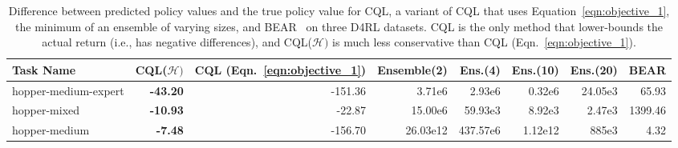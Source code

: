 \begin{table}[h]
\captionsetup{font=small}
\centering
\vspace{-5pt}
    \fontsize{8}{8}\selectfont
    \begin{tabular}{l|r|r||r|r|r|r|r}
    \hline
        \textbf{Task Name} & \textbf{CQL($\mathcal{H})$} & \textbf{CQL (Eqn.~\ref{eqn:objective_1})} & \textbf{Ensemble(2)}  & \textbf{Ens.(4)} & \textbf{Ens.(10)} & \textbf{Ens.(20)} & \textbf{BEAR} \\
        \hline
        hopper-medium-expert & \textbf{-43.20} & -151.36 & 3.71e6 & 2.93e6 & 0.32e6 & 24.05e3 & 65.93 \\
        hopper-mixed & \textbf{-10.93} & -22.87 & 15.00e6 &  59.93e3 & 8.92e3 & 2.47e3 & 1399.46 \\
        hopper-medium & \textbf{-7.48} & -156.70 & 26.03e12 & 437.57e6 & 1.12e12 & 885e3 & 4.32 \\
        \hline
    \end{tabular}
    \caption{{Difference between predicted policy values and the true policy value for CQL, a variant of CQL that uses Equation~\ref{eqn:objective_1}, the minimum of an ensemble of varying sizes, and BEAR~\citep{kumar2019stabilizing} on three D4RL datasets. CQL is the only method that lower-bounds the actual return (i.e., has negative differences), and CQL($\mathcal{H})$ is much less conservative than CQL (Eqn.~\ref{eqn:objective_1}).}}
    \normalsize
    \vspace{-10pt}
    \label{table:cql_lower_bound}
\end{table}



